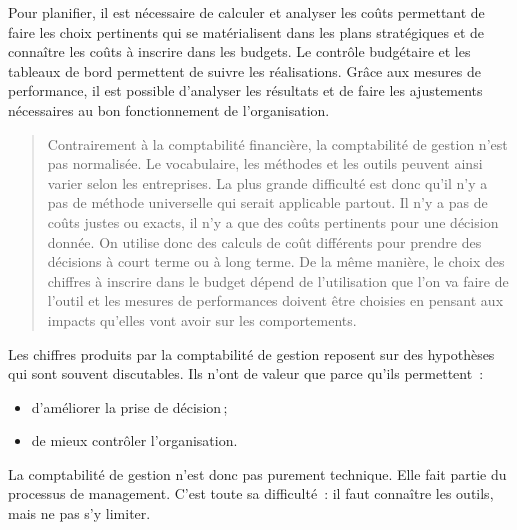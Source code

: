 \documentclass{tufte-handout}
\begin{document}
Pour planifier, il est nécessaire de calculer et analyser les coûts permettant de faire les choix pertinents qui se matérialisent dans les plans stratégiques et de connaître les coûts à inscrire dans les budgets. Le contrôle budgétaire et les tableaux de bord permettent de suivre les réalisations. Grâce aux mesures de performance, il est possible d'analyser les résultats et de faire les ajustements nécessaires au bon fonctionnement de l'organisation.\\

\begin{quote}
Contrairement à la comptabilité financière, la comptabilité de gestion n'est pas normalisée. Le vocabulaire, les méthodes et les outils peuvent ainsi varier selon les entreprises. La plus grande difficulté est donc qu'il n'y a pas de méthode universelle qui serait applicable partout. Il n'y a pas de coûts justes ou exacts, il n'y a que des coûts pertinents pour une décision donnée. On utilise donc des calculs de coût différents pour prendre des décisions à court terme ou à long terme. De la même manière, le choix des chiffres à inscrire dans le budget dépend de l'utilisation que l'on va faire de l'outil et les mesures de performances doivent être choisies en pensant aux impacts qu'elles vont avoir sur les comportements.\\
\end{quote}

Les chiffres produits par la comptabilité de gestion reposent sur des hypothèses qui sont souvent discutables. Ils n'ont de valeur que parce qu'ils permettent :\\
\begin{itemize}
\item d'améliorer la prise de décision ;\\
\item de mieux contrôler l'organisation.\\
\end{itemize}

La comptabilité de gestion n'est donc pas purement technique. Elle fait partie du processus de management. C'est toute sa difficulté : il faut connaître les outils, mais ne pas s'y limiter.\\
\end{document}
